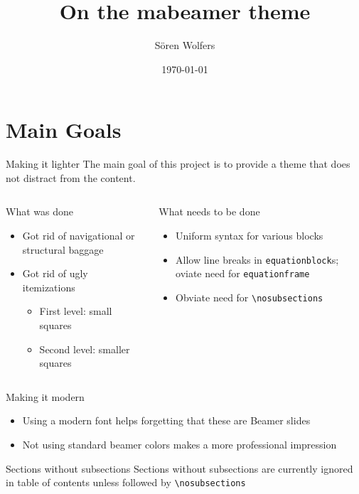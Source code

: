 \documentclass[12pt]{beamer}
\title{On the mabeamer theme}
\date{\today}%
\author[S. Wolfers]{Sören Wolfers}
\begin{document}
\matitle

\section{Main Goals}
\nosubsections

\begin{frame}{Making it lighter}
The main goal of this project is to provide a theme that does not distract from the content.
\begin{columns}
	\begin{column}{0.5\textwidth}	
		\begin{block}{What  was done}
		\begin{itemize}
		\item Got rid of navigational or structural baggage
		\item Got rid of ugly itemizations
		\begin{itemize}
		\item First level: small squares
		\item Second level: smaller squares
		\end{itemize}
		\end{itemize}
		\end{block}
	\end{column}
	\begin{column}{0.5\textwidth}
		\begin{block}{What  needs to be done}
		\begin{itemize}
			\item Uniform syntax for various blocks
			\item Allow line breaks in \texttt{equationblock}s; oviate need for \texttt{equationframe}
			\item Obviate need for \texttt{\textbackslash nosubsections} 
		\end{itemize}
		\end{block}
	\end{column}
\end{columns}
\end{frame}

\begin{frame}{Making it modern}
\begin{itemize}
	\item Using a modern font helps forgetting that these are Beamer slides

	\item Not using {\color{yellow}standard} {\color{blue}beamer} {\color{red}colors} makes a more professional impression
\end{itemize}

\begin{block}{Sections without subsections}
Sections without subsections are currently ignored in table of contents unless followed by \texttt{\textbackslash nosubsections}
\end{block}
\end{frame}
\end{document}
